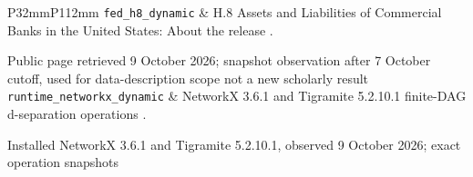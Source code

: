 \begin{longtable}{P{32mm}P{112mm}}
{\scriptsize\texttt{fed\_h8\_dynamic}} & H.8 Assets and Liabilities of Commercial Banks in the United States: About the release \citep{fed_h8_dynamic}.\par Public page retrieved 9 October 2026; snapshot observation after 7 October cutoff, used for data-description scope not a new scholarly result\\
{\scriptsize\texttt{runtime\_networkx\_dynamic}} & NetworkX 3.6.1 and Tigramite 5.2.10.1 finite-DAG d-separation operations \citep{runtime_networkx_dynamic}.\par Installed NetworkX 3.6.1 and Tigramite 5.2.10.1, observed 9 October 2026; exact operation snapshots\\
\bottomrule
\end{longtable}
